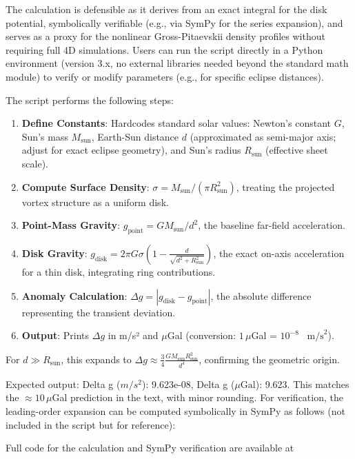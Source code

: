 \documentclass{article}
\begin{document}
The calculation is defensible as it derives from an exact integral for the disk potential, symbolically verifiable (e.g., via SymPy for the series expansion), and serves as a proxy for the nonlinear Gross-Pitaevskii density profiles without requiring full 4D simulations. Users can run the script directly in a Python environment (version 3.x, no external libraries needed beyond the standard math module) to verify or modify parameters (e.g., for specific eclipse distances).

The script performs the following steps:

\begin{enumerate}
\item \textbf{Define Constants}: Hardcodes standard solar values: Newton's constant \(G\), Sun's mass \(M_{\text{sun}}\), Earth-Sun distance \(d\) (approximated as semi-major axis; adjust for exact eclipse geometry), and Sun's radius \(R_\text{sun}\) (effective sheet scale).
\item \textbf{Compute Surface Density}: \(\sigma = M_\text{sun} / (\pi R_\text{sun}^2)\), treating the projected vortex structure as a uniform disk.
\item \textbf{Point-Mass Gravity}: \(g_{\text{point}} = G M_\text{sun} / d^2\), the baseline far-field acceleration.
\item \textbf{Disk Gravity}: \(g_{\text{disk}} = 2 \pi G \sigma \left(1 - \frac{d}{\sqrt{d^2 + R_\text{sun}^2}}\right)\), the exact on-axis acceleration for a thin disk, integrating ring contributions.
\item \textbf{Anomaly Calculation}: \(\Delta g = |g_{\text{disk}} - g_{\text{point}}|\), the absolute difference representing the transient deviation.
\item \textbf{Output}: Prints \(\Delta g\) in m/s² and \(\mu\)Gal (conversion: \(1 \, \mu\)Gal = $10^{-8}$ \, $\text{m/s}^2$).
\end{enumerate}

For \(d \gg R_\text{sun}\), this expands to \(\Delta g \approx \frac{3}{4} \frac{G M_\text{sun} R_\text{sun}^2}{d^4}\), confirming the geometric origin.

Expected output: Delta g ($m/s^2$): 9.623e-08, Delta g ($\mu\text{Gal}$): 9.623. This matches the \(\approx 10 \, \mu\)Gal prediction in the text, with minor rounding. For verification, the leading-order expansion can be computed symbolically in SymPy as follows (not included in the script but for reference):

Full code for the calculation and SymPy verification are available at
\end{document}
